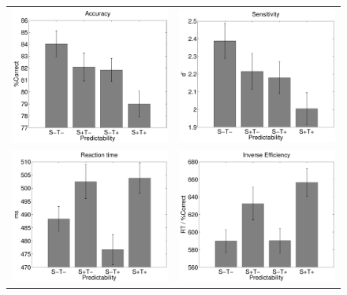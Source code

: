 \documentclass[dwyatte_dissertation.tex]{subfiles}
\begin{document}
\begin{figure}[h!]
\begin{center}
\begin{tabular}{ll}
\includegraphics[width=80mm]{figs/chap_bpleast/results_accuracy.pdf} & 
\includegraphics[width=80mm]{figs/chap_bpleast/results_dprime.pdf} \\
\includegraphics[width=80mm]{figs/chap_bpleast/results_rt.pdf} &
\includegraphics[width=80mm]{figs/chap_bpleast/results_ie.pdf} \\

\end{tabular}
\end{center}
\end{figure}
\end{document}
